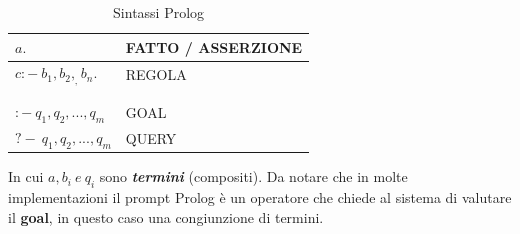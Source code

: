 \documentclass[11pt]{article}
\begin{document}
\begin{table}[ht] %
	\begin{center}
	\caption{Sintassi Prolog}
	\label{sintassiProlog}
	\begin{tabular}{l|l}

	$a.$ & \color{red}FATTO / ASSERZIONE\color{black} \\
	\hline
	$c :- \medspace b_1 , b_2 , _ , b_n . $ & \color{red}REGOLA\color{black} \\
	\\ \\

	$:- \medspace q_1 , q_2 , ... , q_m $ & \color{red}GOAL\color{black} \\
	\hline
	$?-\medspace q_1 , q_2 , ... , q_m $ & \color{red}QUERY\color{black} \\
	
	
	\end{tabular}
	\end{center}
\end{table}
In cui $a, b_i \medspace e \medspace  q_i $ sono \emph{\textbf{termini}} (compositi). 
Da notare che in molte implementazioni il prompt Prolog è un operatore che chiede al sistema di valutare il \textbf{goal}, in questo caso una congiunzione di termini. 
\end{document}
